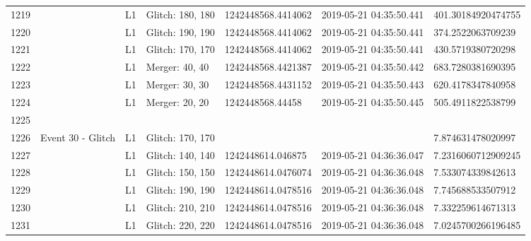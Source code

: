 \begin{longtable}{lllllll}
1219 &                                                    &       L1 &  Glitch: 180, 180 &  1242448568.4414062 &  2019-05-21 04:35:50.441 &  401.30184920474755 \\
1220 &                                                    &       L1 &  Glitch: 190, 190 &  1242448568.4414062 &  2019-05-21 04:35:50.441 &   374.2522063709239 \\
1221 &                                                    &       L1 &  Glitch: 170, 170 &  1242448568.4414062 &  2019-05-21 04:35:50.441 &   430.5719380720298 \\
1222 &                                                    &       L1 &    Merger: 40, 40 &  1242448568.4421387 &  2019-05-21 04:35:50.442 &   683.7280381690395 \\
1223 &                                                    &       L1 &    Merger: 30, 30 &  1242448568.4431152 &  2019-05-21 04:35:50.443 &   620.4178347840958 \\
1224 &                                                    &       L1 &    Merger: 20, 20 &    1242448568.44458 &  2019-05-21 04:35:50.445 &   505.4911822538799 \\
1225 &                                                    &          &                   &                     &                          &                     \\
1226 &                                  Event 30 - Glitch &       L1 &  Glitch: 170, 170 &                     &                          &   7.874631478020997 \\
1227 &                                                    &       L1 &  Glitch: 140, 140 &   1242448614.046875 &  2019-05-21 04:36:36.047 &  7.2316060712909245 \\
1228 &                                                    &       L1 &  Glitch: 150, 150 &  1242448614.0476074 &  2019-05-21 04:36:36.048 &   7.533074339842613 \\
1229 &                                                    &       L1 &  Glitch: 190, 190 &  1242448614.0478516 &  2019-05-21 04:36:36.048 &   7.745688533507912 \\
1230 &                                                    &       L1 &  Glitch: 210, 210 &  1242448614.0478516 &  2019-05-21 04:36:36.048 &   7.332259614671313 \\
1231 &                                                    &       L1 &  Glitch: 220, 220 &  1242448614.0478516 &  2019-05-21 04:36:36.048 &  7.0245700266196485 \\

\end{longtable}
